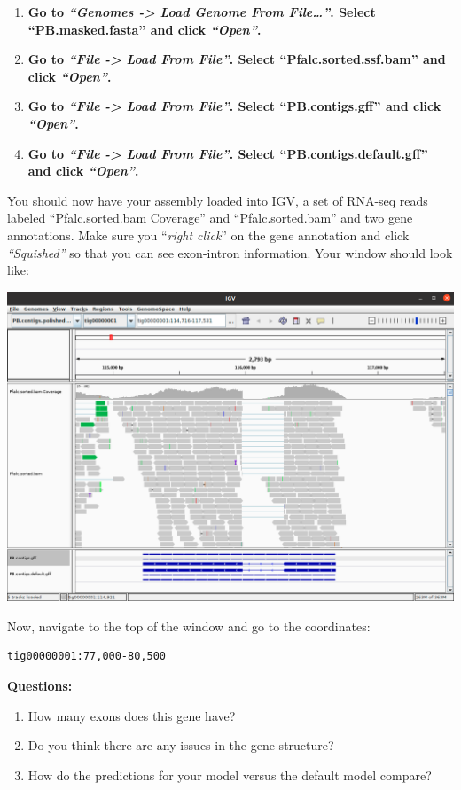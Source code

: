 \documentclass[11pt]{article}
\providecommand{\tightlist}{%
      \setlength{\itemsep}{0pt}\setlength{\parskip}{0pt}}
\begin{document}
\begin{enumerate}
\def\labelenumi{\arabic{enumi}.}
\tightlist
\item
  \textbf{Go to \textit{``Genomes -\textgreater{} Load Genome From
  File\ldots{}''}. Select ``PB.masked.fasta'' and click
  \textit{``Open''}.}
\item
  \textbf{Go to \textit{``File -\textgreater{} Load From File''}. Select
  ``Pfalc.sorted.ssf.bam'' and click \textit{``Open''}.}
\item
  \textbf{Go to \textit{``File -\textgreater{} Load From File''}. Select
  ``PB.contigs.gff'' and click \textit{``Open''}.}
\item
  \textbf{Go to \textit{``File -\textgreater{} Load From File''}. Select
  ``PB.contigs.default.gff'' and click \textit{``Open''}.}
\end{enumerate}

You should now have your assembly loaded into IGV, a set of RNA-seq
reads labeled ``Pfalc.sorted.bam Coverage'' and ``Pfalc.sorted.bam'' and
two gene annotations. Make sure you ``\textit{right click}'' on the gene
annotation and click \textit{``Squished''} so that you can see exon-intron
information. Your window should look like:

\includegraphics{images/IGV_1.png}

Now, navigate to the top of the window and go to the coordinates:

\begin{verbatim}
tig00000001:77,000-80,500
\end{verbatim}

\textbf{Questions:}

\begin{enumerate}
\def\labelenumi{\arabic{enumi}.}
\tightlist
\item
  How many exons does this gene have?
\item
  Do you think there are any issues in the gene structure?
\item
  How do the predictions for your model versus the default model
  compare?
\end{enumerate}
\end{document}
